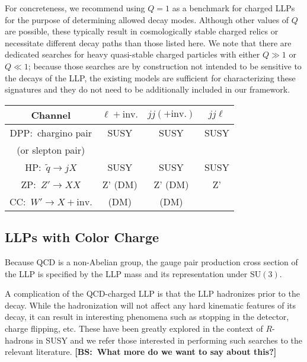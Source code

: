 For concreteness, we recommend using $Q=1$ as a benchmark for charged LLPs for the purpose of determining allowed decay modes. 
Although other values of $Q$ are possible, these typically result in cosmologically stable charged relics or necessitate different decay paths than those listed here.   
We note that there are dedicated searches for heavy quasi-stable charged particles with either $Q\gg1$ or $Q\ll1$; because those searches are by construction not intended to be sensitive to the decays of the LLP, the existing models are sufficient for characterizing these signatures and they do not need to be additionally included in our framework.

\begin{center}
\begin{tabular}{ |c|c|c|c|} 
 \hline
Channel & $\ell+\mathrm{inv.}$ &  $jj(+\mathrm{inv.})$ & $jj\ell$ \\
\hline\hline
DPP:~chargino pair & SUSY & SUSY & SUSY \\
(or slepton pair) & & &\\
\hline
HP:~$\tilde{q}\rightarrow j X$ & SUSY & SUSY & SUSY \\
\hline
ZP:~$Z'\rightarrow XX$ & Z' (DM)& Z' (DM) & Z'  \\
\hline
CC:~$W'\rightarrow X+\mathrm{inv.}$ & (DM) & (DM) & \\
\hline
\end{tabular}
\end{center}

\subsection{LLPs with Color Charge}
\label{sec:coloredLLPs}

Because QCD is a non-Abelian group, the gauge pair production cross section of the LLP is specified by the LLP mass and its representation under $\mathrm{SU}(3)$. 

A complication of the QCD-charged LLP is that the LLP hadronizes prior to the decay. While the hadronization will not affect any hard kinematic features of its decay, it can result in interesting phenomena such as stopping in the detector, charge flipping, etc. These have been greatly explored in the context of $R$-hadrons in SUSY and we refer those interested in performing such searches to the relevant literature. {\bf [BS:~What more do we want to say about this?]}

